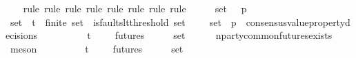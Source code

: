 \begin{isabellebody}
%
\isadelimproof
\ \ %
\endisadelimproof
%
\isatagproof
{}\isamarkupfalse%
\ {\isacharparenleft}rule{\isacharcomma}\ rule{\isacharcomma}\ rule{\isacharcomma}\ rule{\isacharcomma}\ rule{\isacharcomma}\ rule{\isacharcomma}\ rule{\isacharcomma}\ rule{\isacharparenright}\isanewline
{}\isamarkupfalse%
\ {\isacharminus}\isanewline
\ \ \isamarkupfalse%
\ {\isasymsigma}{\isacharunderscore}set\ {\isasymsigma}\ {\isasymsigma}{\isacharprime}\ p\isanewline
\ \ \isamarkupfalse%
\ {\isachardoublequoteopen}{\isasymsigma}{\isacharunderscore}set\ {\isasymsubseteq}\ {\isasymSigma}t{\isachardoublequoteclose}\ \ {\isachardoublequoteopen}finite\ {\isasymsigma}{\isacharunderscore}set{\isachardoublequoteclose}\ \ {\isachardoublequoteopen}is{\isacharunderscore}faults{\isacharunderscore}lt{\isacharunderscore}threshold\ {\isacharparenleft}{\isasymUnion}{\isasymsigma}{\isacharunderscore}set{\isacharparenright}{\isachardoublequoteclose}\ \ {\isachardoublequoteopen}{\isacharbraceleft}{\isasymsigma}{\isacharcomma}\ {\isasymsigma}{\isacharprime}{\isacharbraceright}\ {\isasymsubseteq}\ {\isasymsigma}{\isacharunderscore}set\ {\isasymand}\ p\ {\isasymin}\ consensus{\isacharunderscore}value{\isacharunderscore}property{\isacharunderscore}decisions\ {\isasymsigma}{\isachardoublequoteclose}\ \isanewline
\ \ \isamarkupfalse%
\ {\isachardoublequoteopen}{\isasymexists}\ {\isasymsigma}{\isachardot}\ {\isasymsigma}\ {\isasymin}\ {\isasymSigma}t\ {\isasymand}\ {\isasymsigma}\ {\isasymin}\ {\isasymInter}\ {\isacharbraceleft}futures\ {\isasymsigma}\ {\isacharbar}\ {\isasymsigma}{\isachardot}\ {\isasymsigma}\ {\isasymin}\ {\isasymsigma}{\isacharunderscore}set{\isacharbraceright}{\isachardoublequoteclose}\isanewline
\ \ \ \ \isamarkupfalse%
\ n{\isacharunderscore}party{\isacharunderscore}common{\isacharunderscore}futures{\isacharunderscore}exists\ \isamarkupfalse%
\ meson\isanewline
\ \ \isamarkupfalse%
\ \isamarkupfalse%
\ {\isasymsigma}{\isacharprime}{\isacharprime}\ \ {\isachardoublequoteopen}{\isasymsigma}{\isacharprime}{\isacharprime}\ {\isasymin}\ {\isasymSigma}t\ {\isasymand}\ {\isasymsigma}{\isacharprime}{\isacharprime}\ {\isasymin}\ {\isasymInter}\ {\isacharbraceleft}futures\ {\isasymsigma}\ {\isacharbar}\ {\isasymsigma}{\isachardot}\ {\isasymsigma}\ {\isasymin}\ {\isasymsigma}{\isacharunderscore}set{\isacharbraceright}{\isachardoublequoteclose}\ \isamarkupfalse%

\end{isabellebody}
